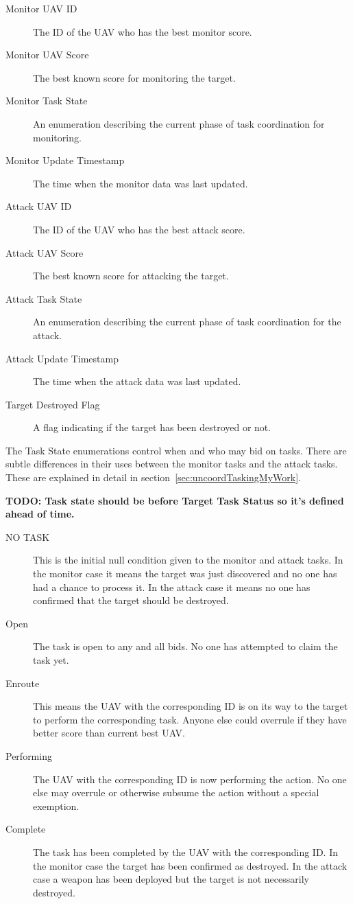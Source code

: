 \begin{multicols*}{2}
\begin{description}
	\item [Monitor UAV ID] The ID of the UAV who has the best monitor score.
	\item [Monitor UAV Score] The best known score for monitoring the target.
	\item [Monitor Task State] An enumeration describing the current phase of task coordination for monitoring.
	\item [Monitor Update Timestamp] The time when the monitor data was last updated.
	\item [Attack UAV ID] The ID of the UAV who has the best attack score.
	\item [Attack UAV Score] The best known score for attacking the target.
	\item [Attack Task State] An enumeration describing the current phase of task coordination for the attack.
	\item [Attack Update Timestamp] The time when the attack data was last updated.
	\item [Target Destroyed Flag] A flag indicating if the target has been destroyed or not.
\end{description}

The Task State enumerations control when and who may bid on tasks.  There are subtle differences in their uses between the monitor tasks and the attack tasks.  These are explained in detail in  section~\ref{sec:uncoordTaskingMyWork}.

\textbf{TODO: Task state should be before Target Task Status so it's defined ahead of time.}

\begin{description}
	\item [NO TASK] This is the initial null condition given to the monitor and attack tasks.  In the monitor case it means the target was just discovered and no one has had a chance to process it.  In the attack case it means no one has confirmed that the target should be destroyed.
	\item [Open] The task is open to any and all bids.  No one has attempted to claim the task yet.
	\item [Enroute] This means the UAV with the corresponding ID is on its way to the target to perform the corresponding task.  Anyone else could overrule if they have better score than current best UAV.
	\item [Performing] The UAV with the corresponding ID is now performing the action.  No one else may overrule or otherwise subsume the action without a special exemption.%
	\item [Complete] The task has been completed by the UAV with the corresponding ID.  In the monitor case the target has been confirmed as destroyed.  In the attack case a weapon has been deployed but the target is not necessarily destroyed.
\end{description}


\end{multicols*}
